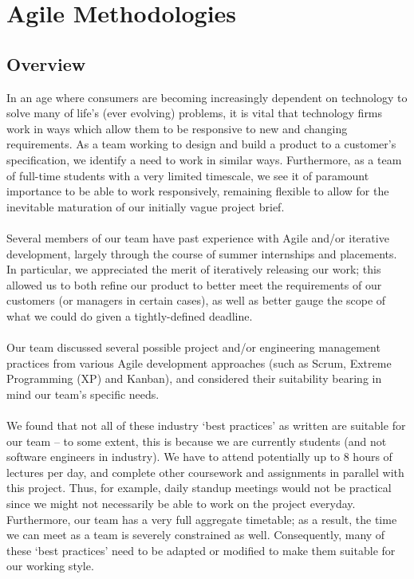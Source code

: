 \documentclass[10pt]{article}
\begin{document}
\section{Agile Methodologies}
\subsection{Overview}
In an age where consumers are becoming increasingly dependent on technology to solve many of life's (ever evolving) problems, it is vital that technology firms work in ways which allow them to be responsive to new and changing requirements. As a team working to design and build a product to a customer's specification, we identify a need to work in similar ways. Furthermore, as a team of full-time students with a very limited timescale, we see it of paramount importance to be able to work responsively, remaining flexible to allow for the inevitable maturation of our initially vague project brief.\\\\
Several members of our team have past experience with Agile and/or iterative development, largely through the course of summer internships and placements. In particular, we appreciated the merit of iteratively releasing our work; this allowed us to both refine our product to better meet the requirements of our customers (or managers in certain cases), as well as better gauge the scope of what we could do given a tightly-defined deadline.\\\\
Our team discussed several possible project and/or engineering management practices from various Agile development approaches (such as Scrum, Extreme Programming (XP) and Kanban), and considered their suitability bearing in mind our team's specific needs.\\\\
We found that not all of these industry `best practices' as written are suitable for our team -- to some extent, this is because we are currently students (and not software engineers in industry). We have to attend potentially up to 8 hours of lectures per day, and complete other coursework and assignments in parallel with this project. Thus, for example, daily standup meetings would not be practical since we might not necessarily be able to work on the project everyday. Furthermore, our team has a very full aggregate timetable; as a result, the time we can meet as a team is severely constrained as well. Consequently, many of these `best practices' need to be adapted or modified to make them suitable for our working style.\\\\
\end{document}
